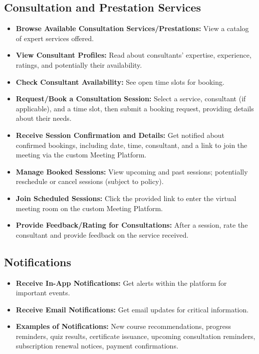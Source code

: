 \documentclass[12pt, a4paper]{report} %
\begin{document}
  \subsection{Consultation and Prestation Services}
    \begin{itemize}
        \item \textbf{Browse Available Consultation Services/Prestations:} View a catalog of expert services offered.
        \item \textbf{View Consultant Profiles:} Read about consultants' expertise, experience, ratings, and potentially their availability.
        \item \textbf{Check Consultant Availability:} See open time slots for booking.
        \item \textbf{Request/Book a Consultation Session:} Select a service, consultant (if applicable), and a time slot, then submit a booking request, providing details about their needs.
        \item \textbf{Receive Session Confirmation and Details:} Get notified about confirmed bookings, including date, time, consultant, and a link to join the meeting via the custom Meeting Platform.
        \item \textbf{Manage Booked Sessions:} View upcoming and past sessions; potentially reschedule or cancel sessions (subject to policy).
        \item \textbf{Join Scheduled Sessions:} Click the provided link to enter the virtual meeting room on the custom Meeting Platform.
        \item \textbf{Provide Feedback/Rating for Consultations:} After a session, rate the consultant and provide feedback on the service received.
    \end{itemize}
  \subsection{Notifications}
    \begin{itemize}
        \item \textbf{Receive In-App Notifications:} Get alerts within the platform for important events.
        \item \textbf{Receive Email Notifications:} Get email updates for critical information.
        \item \textbf{Examples of Notifications:} New course recommendations, progress reminders, quiz results, certificate issuance, upcoming consultation reminders, subscription renewal notices, payment confirmations.
    \end{itemize}
\end{document}
